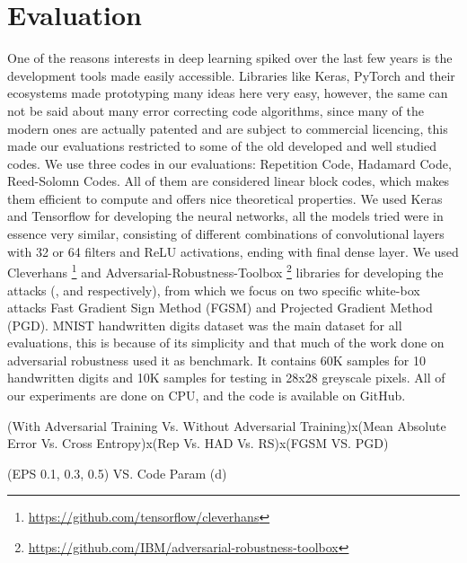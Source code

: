 \documentclass{article}
\begin{document}
\section{Evaluation}
One of the reasons interests in deep learning spiked over the last few years is the development tools made easily accessible. Libraries like Keras, PyTorch and their ecosystems made prototyping many ideas here very easy, however, the same can not be said about many error correcting code algorithms, since many of the modern ones are actually patented and are subject to commercial licencing, this made our evaluations restricted to some of the old developed and well studied codes. We use three codes in our evaluations: Repetition Code, Hadamard Code, Reed-Solomn Codes. All of them are considered linear block codes, which makes them efficient to compute and offers nice theoretical properties. We used Keras and Tensorflow for developing the neural networks, all the models tried were in essence very similar, consisting of different combinations of convolutional layers with 32 or 64 filters and ReLU activations, ending with final dense layer. We used Cleverhans \footnote{\href{https://github.com/tensorflow/cleverhans}{https://github.com/tensorflow/cleverhans}} and Adversarial-Robustness-Toolbox \footnote{\href{https://github.com/IBM/adversarial-robustness-toolbox}{https://github.com/IBM/adversarial-robustness-toolbox}}  libraries for developing the attacks (\cite{papernot2018cleverhans}, and \cite{art2018} respectively), from which we focus on two specific white-box attacks Fast Gradient Sign Method (FGSM) and Projected Gradient Method (PGD). MNIST handwritten digits dataset was the main dataset for all evaluations, this is because of its simplicity and that much of the work done on adversarial robustness used it as benchmark. It contains 60K samples for 10 handwritten digits and 10K samples for testing in 28x28 greyscale pixels. All of our experiments are done on CPU, and the code is available on GitHub. %


(With Adversarial Training Vs. Without Adversarial Training)x(Mean Absolute Error Vs. Cross Entropy)x(Rep Vs. HAD Vs. RS)x(FGSM VS. PGD)

(EPS 0.1, 0.3, 0.5) VS. Code Param (d)


\end{document}
